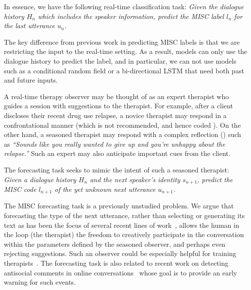 In essence, we have the following real-time classification task:
\emph{Given the dialogue history $H_n$ which includes the speaker
  information, predict the MISC label $l_n$ for the last utterance
  $u_n$.}

The key difference from previous work in predicting MISC labels is
that we are restricting the input to the
real-time setting. As a result, models can only use the dialogue
history to predict the label, and in particular, we can not use models
such as a conditional random field or a bi-directional LSTM that need both past and future inputs. 



A real-time therapy observer may be thought of as an expert
therapist who guides a session with suggestions to the therapist.
For example, after a client discloses their recent drug use
relapse, a novice therapist may respond in a confrontational manner
(which is not recommended, and hence coded \MIN). On the other
hand, a seasoned therapist may respond with a complex reflection
(\REC) such as \emph{``Sounds like you really wanted to give up and
  you're unhappy about the relapse.''}
Such an expert may also anticipate important cues
from the client.%

The forecasting task seeks to mimic the intent of such a seasoned therapist:
\emph{Given a dialogue history $H_n$ and the next speaker's identity
  $s_{n+1}$, predict the MISC code $l_{n+1}$ of the yet unknown next
  utterance $u_{n+1}$.}

The MISC forecasting task is a previously unstudied problem. %
We argue that forecasting the type of the next utterance, rather than
selecting or generating its text as has been the focus of several
recent lines of work~\cite[\eg,][]{schatzmann2005quantitative,ubuntu,DSTC7},
allows the human in the loop (the therapist) the freedom to
creatively participate in the conversation within the parameters
defined by the seasoned observer, and perhaps even rejecting
suggestions. Such an observer could be especially helpful for
training therapists~\cite{imel2017technology}.
%
The forecasting task is also related to recent work on detecting
antisocial comments in online
conversations~\cite{zhang2018conversations} whose goal is to
provide an early warning for such events.

